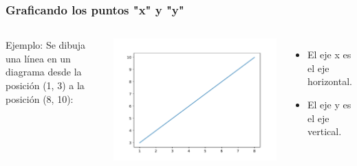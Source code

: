 \begin{frame}[fragile]
  \frametitle{Graficando los puntos "x" y "y"}
  \begin{columns}
        \begin{exampleblock}{Ejemplo:}
          Se dibuja una línea en un diagrama desde la posición
          (1, 3) a la posición (8, 10):
          
        \end{exampleblock}
      \pausa
      \begin{center}
          \includegraphics[scale=0.4]{ejemplos/e02.pdf}
      \end{center}
      \begin{itemize}
        \item El eje x es el eje horizontal.
        \item El eje y es el eje vertical.
      \end{itemize}
  \end{columns}
\end{frame}

